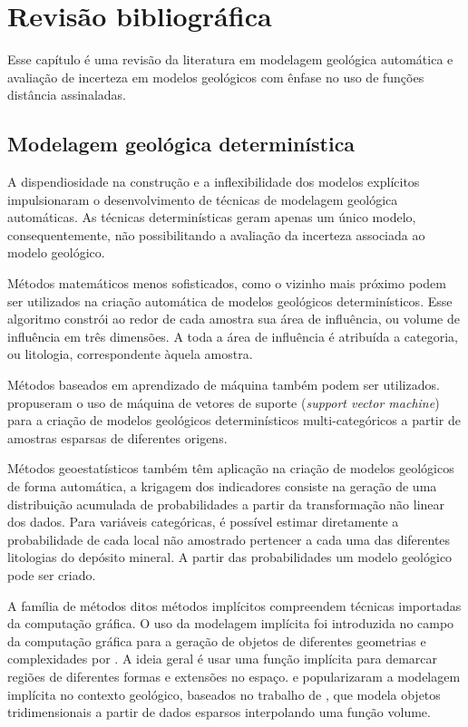 \chapter{Revisão bibliográfica}

Esse capítulo é uma revisão da literatura em modelagem geológica automática e avaliação de incerteza em modelos geológicos com ênfase no uso de funções distância assinaladas.

\section{Modelagem geológica determinística}

A dispendiosidade na construção e a inflexibilidade dos modelos explícitos impulsionaram o desenvolvimento de técnicas de modelagem geológica automáticas. As técnicas determinísticas geram apenas um único modelo, consequentemente, não possibilitando a avaliação da incerteza associada ao modelo geológico. 

Métodos matemáticos menos sofisticados, como o vizinho mais próximo podem ser utilizados na criação automática de modelos geológicos determinísticos. Esse algoritmo constrói ao redor de cada amostra sua área de influência, ou volume de influência em três dimensões. A toda a área de influência é atribuída a categoria, ou litologia, correspondente àquela amostra. 

Métodos baseados em aprendizado de máquina também podem ser utilizados.  propuseram o uso de máquina de vetores de suporte (\textit{support vector machine}) para a criação de modelos geológicos determinísticos multi-categóricos a partir de amostras esparsas de diferentes origens.

Métodos geoestatísticos também têm aplicação na criação de modelos geológicos de forma automática, a krigagem dos indicadores \cite{alabert1987stochastic} consiste na geração de uma distribuição acumulada de probabilidades a partir da transformação não linear dos dados. Para variáveis categóricas, é possível estimar diretamente a probabilidade de cada local não amostrado pertencer a cada uma das diferentes litologias do depósito mineral. A partir das probabilidades um modelo geológico pode ser criado.
 
A família de métodos ditos métodos implícitos compreendem técnicas importadas da computação gráfica. O uso da modelagem implícita foi introduzida no campo da computação gráfica para a geração de objetos de diferentes geometrias e complexidades por  . A ideia geral é usar uma função implícita para demarcar regiões de diferentes formas e extensões no espaço.  e  popularizaram a modelagem implícita no contexto geológico, baseados no trabalho de , que modela objetos tridimensionais a partir de dados esparsos interpolando uma função volume.


